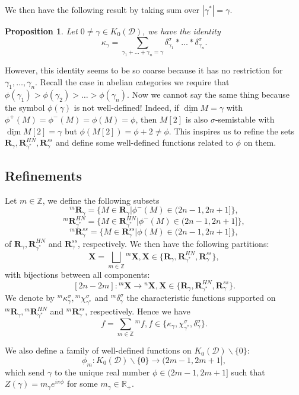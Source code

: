 \documentclass[a4paper,12pt]{amsart}
\newtheorem{proposition}[theorem]{Proposition}
\newcommand{\udv}{\underline{\dim}}
\begin{document}
We then have the following result by taking sum over $|\gamma^*|=\gamma$.
\begin{proposition}\label{HN,coarse}
    Let $0\neq\gamma\in K_0(\mathcal{D})$, we have the identity
    \[\kappa_\gamma=\sum_{\gamma_1+\dots+\gamma_n=\gamma}\delta^\sigma_{\gamma_1}*\dots*\delta^\sigma_{\gamma_n}.\]
\end{proposition}
However, this identity seems to be so coarse because it has no restriction for $\gamma_1,\dots,\gamma_n$. Recall the case in abelian categories we require that $\phi(\gamma_1)>\phi(\gamma_2)>\dots>\phi(\gamma_n)$. Now we cannot say the same thing because the symbol $\phi(\gamma)$ is not well-defined! Indeed, if $\udv M=\gamma$ with $\phi^+(M)=\phi^-(M)=\phi(M)=\phi$, then $M[2]$ is also $\sigma$-semistable with $\udv M[2]=\gamma$ but $\phi(M[2])=\phi+2\neq\phi$. This inspires us to refine the sets $\mathbf{R}_\gamma,\mathbf{R}_{\gamma^*}^{HN},\mathbf{R}_{\gamma}^{ss}$ and define some well-defined functions related to $\phi$ on them.
\subsection{Refinements}
Let $m\in\mathbb{Z}$, we define the following subsets
\[^m\mathbf{R}_\gamma=\{M\in\mathbf{R}_\gamma|\phi^-(M)\in(2n-1,2n+1]\},\]
\[^m\mathbf{R}_{\gamma^*}^{HN}=\{M\in\mathbf{R}_{\gamma^*}^{HN}|\phi^-(M)\in(2n-1,2n+1]\},\]
\[^m\mathbf{R}_\gamma^{ss}=\{M\in\mathbf{R}_\gamma^{ss}|\phi(M)\in(2n-1,2n+1]\},\]
of $\mathbf{R}_\gamma,\mathbf{R}_{\gamma^*}^{HN}$ and $\mathbf{R}_\gamma^{ss}$, respectively. We then have the following partitions:
\[\mathbf{X}=\bigsqcup_{m\in\mathbb{Z}}{^m}\mathbf{X},\mathbf{X}\in\{\mathbf{R}_\gamma,\mathbf{R}_{\gamma^*}^{HN},\mathbf{R}_\gamma^{ss}\},\]
with bijections between all components:
\[[2n-2m]:{^m}\mathbf{X}\rightarrow{^n}\mathbf{X},\mathbf{X}\in\{\mathbf{R}_\gamma,\mathbf{R}_{\gamma^*}^{HN},\mathbf{R}_\gamma^{ss}\}.\]
We denote by ${^m}\kappa^\sigma_\gamma,{^m}\chi^\sigma_{\gamma^*}$ and ${^m}\delta^\sigma_\gamma$ the characteristic functions supported on ${^m}\mathbf{R}_\gamma,{^m}\mathbf{R}_{\gamma^*}^{HN}$ and ${^m}\mathbf{R}_\gamma^{ss}$, respectively. Hence we have
\[f=\sum_{m\in\mathbb{Z}}{^m}f,f\in\{\kappa_\gamma,\chi^\sigma_{\gamma^*},\delta^\sigma_\gamma\}.\]

We also define a family of well-defined functions on $K_0(\mathcal{D})\backslash\{0\}$:
\[\phi_m:K_0(\mathcal{D})\backslash\{0\}\rightarrow(2m-1,2m+1],\]
which send $\gamma$ to the unique real number $\phi\in(2m-1,2m+1]$ such that $Z(\gamma)=m_\gamma e^{i\pi\phi}$ for some $m_\gamma\in\mathbb{R}_+$.
\end{document}
